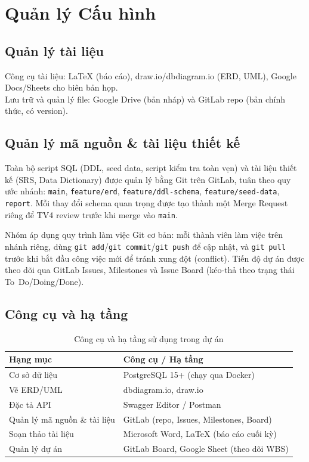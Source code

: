 \section{Quản lý Cấu hình}

\subsection{Quản lý tài liệu}
Công cụ tài liệu: LaTeX (báo cáo), draw.io/dbdiagram.io (ERD, UML), Google Docs/Sheets cho biên bản họp.\\
Lưu trữ và quản lý file: Google Drive (bản nháp) và GitLab repo (bản chính thức, có version).

\subsection{Quản lý mã nguồn \& tài liệu thiết kế}
Toàn bộ script SQL (DDL, seed data, script kiểm tra toàn vẹn) và tài liệu thiết kế (SRS, Data Dictionary) được quản lý bằng Git trên GitLab, tuân theo quy ước nhánh: \texttt{main}, \texttt{feature/erd}, \texttt{feature/ddl-schema}, \texttt{feature/seed-data}, \texttt{report}. Mỗi thay đổi schema quan trọng được tạo thành một Merge Request riêng để TV4 review trước khi merge vào \texttt{main}.

Nhóm áp dụng quy trình làm việc Git cơ bản: mỗi thành viên làm việc trên nhánh riêng, dùng \texttt{git add}/\texttt{git commit}/\texttt{git push} để cập nhật, và \texttt{git pull} trước khi bắt đầu công việc mới để tránh xung đột (conflict). Tiến độ dự án được theo dõi qua GitLab Issues, Milestones và Issue Board (kéo-thả theo trạng thái To~Do/Doing/Done).

\subsection{Công cụ và hạ tầng}
\begin{table}[htbp]
    \centering
    \small
    \caption{Công cụ và hạ tầng sử dụng trong dự án}
    \begin{tabular}{|p{3.5cm}|p{9cm}|}
        \hline
        \textbf{Hạng mục} & \textbf{Công cụ / Hạ tầng} \\
        \hline
        Cơ sở dữ liệu & PostgreSQL 15+ (chạy qua Docker) \\
        \hline
        Vẽ ERD/UML & dbdiagram.io, draw.io \\
        \hline
        Đặc tả API & Swagger Editor / Postman \\
        \hline
        Quản lý mã nguồn \& tài liệu & GitLab (repo, Issues, Milestones, Board) \\
        \hline
        Soạn thảo tài liệu & Microsoft Word, LaTeX (báo cáo cuối kỳ) \\
        \hline
        Quản lý dự án & GitLab Board, Google Sheet (theo dõi WBS) \\
        \hline
    \end{tabular}
\end{table}

